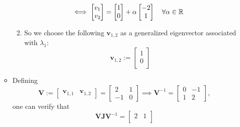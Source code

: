 \documentclass[12pt,a4paper]{article}
\begin{document}
\begin{itemize}
\begin{itemize}
\begin{enumerate}
\begin{equation}
\begin{matrix*}[l]
        \end{matrix*}
        \iff
        \begin{bmatrix}
          v_{1} \\
          v_{2} \\
        \end{bmatrix}
        =
        \begin{bmatrix}
          1 \\
          0 \\
        \end{bmatrix}
        +
        \alpha
        \begin{bmatrix}
          -2 \\
          1 \\
        \end{bmatrix}
        \quad \forall \alpha\in \R
      \end{equation}
    \item So we choose the following $\bm{v}_{1,2}$ as a generalized eigenvector associated with $\lambda_{1}$:
      \begin{equation}\nonumber%
        \bm{v}_{1,2} := 
        \begin{bmatrix}
          1 \\
          0 \\
        \end{bmatrix}
      \end{equation}
    \end{enumerate}
  \item Defining
    \begin{equation}\nonumber%
      \bm{V} :=
      \begin{bmatrix}
        \bm{v}_{1,1} & \bm{v}_{1,2}
      \end{bmatrix}
      =
      \begin{bmatrix}
        2 & 1 \\
        -1 & 0
      \end{bmatrix}
      \implies
      \bm{V}^{-1}
      = 
      \begin{bmatrix}
        0 & -1 \\
        1 & 2
      \end{bmatrix},
    \end{equation}
    one can verify that
    \begin{equation}\nonumber%
      \bm{V}\bm{J}\bm{V}^{-1}
      =
      \begin{bmatrix}
        2 & 1 \\

\end{bmatrix}
\end{equation}
\end{itemize}
\end{itemize}
\end{document}
